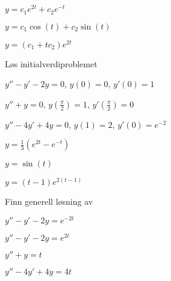\begin{losning}
	\begin{punkt}
		$y=c_1 e^{2t}+c_2 e^{-t}$
	\end{punkt}
	
	\begin{punkt}
		$y=c_1\cos(t)+ c_2 \sin (t)$
	\end{punkt}
	
	\begin{punkt}
		$y=(c_1+tc_2)e^{2t}$
	\end{punkt}
	
\end{losning}


\begin{oppgave}
Løs initialverdiproblemet
	\begin{punkt}
		$y''-y'-2y=0$, $y(0)=0$, $y'(0)=1$
	\end{punkt}
	
	\begin{punkt}
		$y''+y=0$, $y(\frac{\pi}{2})=1$, $y'(\frac{\pi}{2})=0$
	\end{punkt}
	
	\begin{punkt}
		$y''-4y'+4y=0$, $y(1)=2$, $y'(0)=e^{-2}$
	\end{punkt}
	
\end{oppgave}

\begin{losning}
	\begin{punkt}
		$y=\frac{1}{3}( e^{2t}- e^{-t})$
	\end{punkt}
	
	\begin{punkt}
		$y= \sin (t)$
	\end{punkt}
	
	\begin{punkt}
		$y=(t-1)e^{2(t-1)}$
	\end{punkt}
	
\end{losning}


\begin{oppgave}
	Finn generell løsning av
	\begin{punkt}
		$y''-y'-2y=e^{-2t}$
	\end{punkt}

	\begin{punkt}
		$y''-y'-2y=e^{2t}$
	\end{punkt}
	
	\begin{punkt}
		$y''+y=t$
	\end{punkt}
	
	\begin{punkt}
		$y''-4y'+4y=4t$
	\end{punkt}
	
\end{oppgave}

